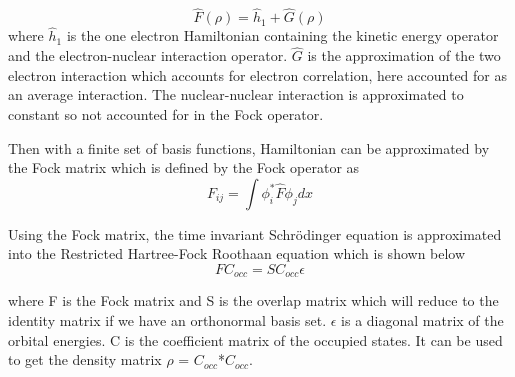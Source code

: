\documentclass[twoside]{article}
\begin{document}
\[
\hat{F}(\rho) = \hat{h}_1 + \hat{G}(\rho)
\]
where $\hat{h}_1$ is the one electron Hamiltonian containing the kinetic energy operator and the electron-nuclear interaction operator. $\hat{G}$ is the approximation of the two electron interaction which accounts for electron correlation, here accounted for as an average interaction. The nuclear-nuclear interaction is approximated to constant so not accounted for in the Fock operator. 

Then with a finite set of basis functions, Hamiltonian can be approximated by the Fock matrix which is defined by the Fock operator as
\[
F_{ij} = \int \phi_i^*\hat{F}\phi_j dx
\]







Using the Fock matrix, the time invariant Schr\"{o}dinger equation is approximated into the Restricted Hartree-Fock Roothaan equation which is shown below
\[
FC_{occ} = SC_{occ}\epsilon
\]





where F is the Fock matrix and S is the overlap matrix which will reduce to the identity matrix if we have an orthonormal basis set. $\epsilon$ is a diagonal matrix of the orbital energies. C is the coefficient matrix of the occupied states. It can be used to get the density matrix $\rho$ =  $C_{occ}$*$C_{occ}$.
\end{document}
